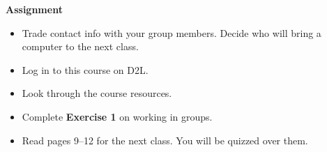 {\bf Assignment}\\
\begin{itemize}
\item  Trade contact info with your group members.  Decide who will
  bring a computer to the next class.
\item   Log in to this course on D2L.
\item   Look through the course resources.
\item  Complete {\bf Exercise 1} on working in groups.
\item Read pages 9--12 for the next class. You will be quizzed over them.
\end{itemize}




  



